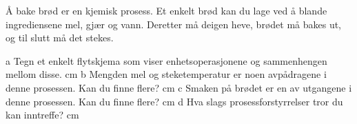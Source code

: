 \documentclass[12pt,a4paper]{article}
\begin{document}
Å bake brød er en kjemisk prosess. Et enkelt brød kan du lage ved å blande ingrediensene mel, gjær og vann. Deretter må deigen heve, brødet må bakes ut, og til slutt må det stekes.

a Tegn et enkelt flytskjema som viser enhetsoperasjonene og sammenhengen mellom disse.
 cm 
b Mengden mel og steketemperatur er noen avpådragene i denne prosessen. Kan du finne flere?
 cm 
c Smaken på brødet er en av utgangene i denne prosessen. Kan du finne flere?
 cm 
d Hva slags prosessforstyrrelser tror du kan inntreffe?
 cm 

\vskip 5pt 
\vskip 2.5pt 
\end{document}
